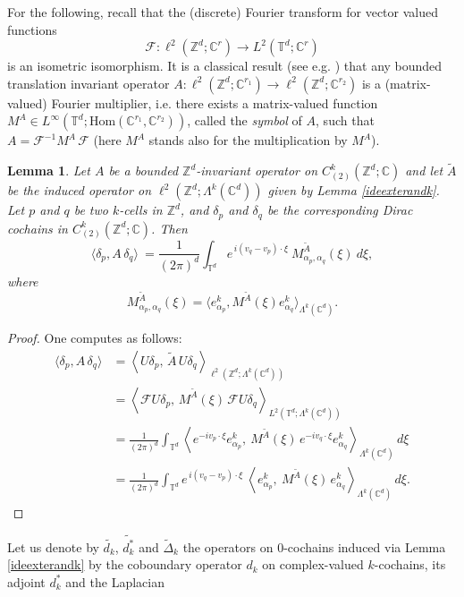 \documentclass[11pt,reqno]{amsart}
\numberwithin{equation}{section}
\newtheorem{lemma}[theorem]{Lemma}
\theoremstyle{remark}
\theoremstyle{rmdefinition}
\begin{document}
For the following, recall that the (discrete) Fourier transform for vector valued functions
$$ \mathcal{F}: \ell^2(\mathbb{Z}^d;\mathbb{C}^r)\to L^2(\mathbb{T}^d;\mathbb{C}^r)$$ is an isometric isomorphism. It is a classical result (see e.g. \cite[I.8.5]{Kat}) that any bounded translation invariant operator $A: \ell^2(\mathbb{Z}^d;\mathbb{C}^{r_1}) \to \ell^2(\mathbb{Z}^d;\mathbb{C}^{r_2})$ is a (matrix-valued) Fourier multiplier, i.e. there exists a matrix-valued function $M^A\in L^\infty(\mathbb{T}^d;\mathrm{Hom}(\mathbb{C}^{r_1},\mathbb{C}^{r_2}))$, called the {\em symbol} of $A$, such that $A=\mathcal{F}^{-1} M^A\,\mathcal{F}$ (here $M^A$ stands also for the multiplication by $M^A$).
\begin{lemma}\label{symtrainop}
Let $A$ be a bounded $\mathbb{Z}^d$-invariant operator on $C^k_{(2)} (\mathbb{Z}^d;\mathbb{C})$ and let $\tilde{A}$ be the induced operator on  $\ell^2(\mathbb{Z}^d;\Lambda^k(\mathbb{C}^d))$ given by Lemma \ref{ideexterandk}. Let $p$ and $q$ be two $k$-cells in $\mathbb{Z}^d$, and $\delta_p$ and $\delta_q$ be the corresponding Dirac cochains in $C^k_{(2)} (\mathbb{Z}^d;\mathbb{C})$. Then
$$\langle \delta_{p}, A\,\delta_{q}\rangle\ = \frac{1}{(2\pi)^d}\int_{\mathbb{T}^d} e^{\,i (v_q-v_p)\cdot \xi}\ M^{\tilde A}_{\alpha_p,\alpha_q}(\xi)\ d\xi,$$ 
where $$M^{\tilde A}_{\alpha_p,\alpha_q}(\xi)=\langle e^{k}_{\alpha_p}, M^{\tilde A}(\xi)e^{k}_{\alpha_q}\rangle_{\Lambda^k(\mathbb{C}^d)}.$$
\end{lemma}
\begin{proof}
One computes as follows:
\begin{align*}
	\langle \delta_{p}, A\,\delta_{q}\rangle
	&=\left\langle U\delta_{p},\, \tilde{A}\,U\delta_{q}\right\rangle_{\ell^2(\mathbb{Z}^d;\Lambda^k(\mathbb{C}^d))} \nonumber\\
	&=\left\langle \mathcal{F}U\delta_{p},\, M^{\tilde{A}}(\xi)\,\mathcal{F}U\delta_{q}\right\rangle_{L^2(\mathbb{T}^d;\Lambda^k(\mathbb{C}^d))} \nonumber\\
	&=\frac{1}{(2\pi)^d}\int_{\mathbb{T}^d} \left\langle e^{-i v_p\cdot \xi} e^{k}_{\alpha_p},\ M^{\tilde{A}}(\xi)\, e^{-i v_q\cdot \xi} e^{k}_{\alpha_q}\right\rangle_{\Lambda^k(\mathbb{C}^d)}\, d\xi \nonumber\\
	&=\frac{1}{(2\pi)^d}\int_{\mathbb{T}^d} e^{\,i (v_q-v_p)\cdot \xi}\ \left\langle e^{k}_{\alpha_p},\ M^{\tilde{A}}(\xi)\, e^{k}_{\alpha_q}\right\rangle_{\Lambda^k(\mathbb{C}^d)}\, d\xi. 
\end{align*}
\end{proof}
Let us denote by $\tilde{d_k}$, $\tilde{d^*_k}$ and $\tilde{\Delta}_k$ the operators on 0-cochains induced via Lemma \ref{ideexterandk} by the coboundary operator $d_k$ on complex-valued $k$-cochains, its adjoint $d^*_k$ and the Laplacian 
\end{document}
